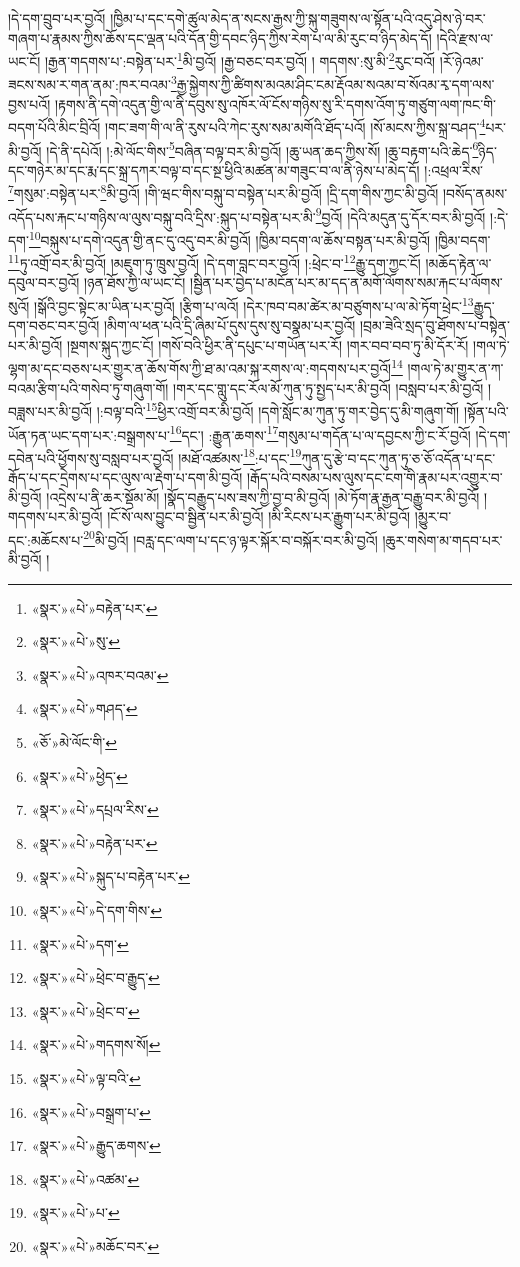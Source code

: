 །དེ་དག་བྲུབ་པར་བྱའོ། །ཁྱིམ་པ་དང་དགེ་ཚུལ་མེད་ན་སངས་རྒྱས་ཀྱི་སྐུ་གཟུགས་ལ་སྟོན་པའི་འདུ་ཤེས་ཉེ་བར་གཞག་པ་རྣམས་ཀྱིས་ཆོས་དང་ལྡན་པའི་དོན་གྱི་དབང་ཉིད་ཀྱིས་རེག་པ་ལ་མི་རུང་བ་ཉིད་མེད་དོ། །དེའི་རྫས་ལ་ཡང་ངོ། །རྒྱན་གདགས་པ་:བསྟེན་པར་\footnote{«སྣར་»«པེ་»བརྟེན་པར་}མི་བྱའོ། །རྒྱ་བཅང་བར་བྱའོ། །
གདགས་:སུ་མི་\footnote{«སྣར་»«པེ་»སུ་}རུང་བའོ། །རོ་ཉེའམ་ཟངས་སམ་ར་གན་ནམ་:ཁར་བའམ་\footnote{«སྣར་»«པེ་»འཁར་བའམ་}རྒྱ་སྐྱེགས་ཀྱི་ཚིགས་མའམ་ཤིང་ངམ་རྡོའམ་སའམ་བ་སོའམ་རྭ་དག་ལས་བྱས་པའོ། །རྟགས་ནི་དགེ་འདུན་གྱི་ལ་ནི་དབུས་སུ་འཁོར་ལོ་ངོས་གཉིས་སུ་རི་དགས་འོག་ཏུ་གཙུག་ལག་ཁང་གི་བདག་པོའི་མིང་བྲིའོ། །གང་ཟག་གི་ལ་ནི་རུས་པའི་ཀེང་རུས་སམ་མགོའི་ཐོད་པའོ། །སོ་མངས་ཀྱིས་སྐྲ་བཤད་\footnote{«སྣར་»«པེ་»གཤད་}པར་མི་བྱའོ། །དེ་ནི་དཔེའོ། །:མེ་ལོང་གིས་\footnote{«ཅོ་»མེ་ལོང་གི་}བཞིན་བལྟ་བར་མི་བྱའོ། །ཆུ་ཡན་ཆད་ཀྱིས་སོ། །ཆུ་བརྟག་པའི་ཆེད་\footnote{«སྣར་»«པེ་»ཕྱེད་}ཉིད་དང་གཉེར་མ་དང་རྨ་དང་སྐྲ་དཀར་བལྟ་བ་དང་སྔ་ཕྱིའི་མཚན་མ་གཟུང་བ་ལ་ནི་ཉེས་པ་མེད་དོ། །:འཕྲལ་རིས་\footnote{«སྣར་»«པེ་»དཔྲལ་རིས་}གསུམ་:བསྟེན་པར་\footnote{«སྣར་»«པེ་»བརྟེན་པར་}མི་བྱའོ། །གི་ཝང་གིས་བསྐུ་བ་བསྟེན་པར་མི་བྱའོ། །དྲི་དག་གིས་ཀྱང་མི་བྱའོ། །བསོད་ནམས་འདོད་པས་རྐང་པ་གཉིས་ལ་ལུས་བསྐུ་བའི་དྲིས་:སྐུད་པ་བསྟེན་པར་མི་\footnote{«སྣར་»«པེ་»སྐུད་པ་བརྟེན་པར་}བྱའོ། །དེའི་མདུན་དུ་དོར་བར་མི་བྱའོ། །:དེ་དག་\footnote{«སྣར་»«པེ་»དེ་དག་གིས་}བསྐུས་པ་དགེ་འདུན་གྱི་ནང་དུ་འདུ་བར་མི་བྱའོ། །ཁྱིམ་བདག་ལ་ཆོས་བསྟན་པར་མི་བྱའོ། །ཁྱིམ་བདག་\footnote{«སྣར་»«པེ་»དག་}ཏུ་འགྲོ་བར་མི་བྱའོ། །མཇུག་ཏུ་ཁྲུས་བྱའོ། །དེ་དག་བླང་བར་བྱའོ། །:ཕྲེང་བ་\footnote{«སྣར་»«པེ་»ཕྲེང་བ་རྒྱུད་}རྒྱུ་དག་ཀྱང་ངོ། །མཆོད་རྟེན་ལ་དབུལ་བར་བྱའོ། །ཉན་ཐོས་ཀྱི་ལ་ཡང་ངོ། །སྦྱིན་པར་བྱེད་པ་མངོན་པར་མ་དད་ན་མགོ་ལོགས་སམ་རྐང་པ་ལོགས་སུའོ། །སྒོའི་བྱང་སྟེང་མ་ཡིན་པར་བྱའོ། །རྩིག་པ་ལའོ། །དེར་ཁབ་བམ་ཚེར་མ་བཙུགས་པ་ལ་མེ་ཏོག་ཕྲེང་\footnote{«སྣར་»«པེ་»ཕྲེང་བ་}རྒྱུད་དག་བཅང་བར་བྱའོ། །མིག་ལ་ཕན་པའི་དྲི་ཞིམ་པོ་དུས་དུས་སུ་བསྣམ་པར་བྱའོ། །བྲམ་ཟེའི་སྲད་བུ་ཐོགས་པ་བསྟེན་པར་མི་བྱའོ། །སྔགས་སྐུད་ཀྱང་ངོ། །གསོ་བའི་ཕྱིར་ནི་དཔུང་པ་གཡོན་པར་རོ། །གར་བབ་བབ་ཏུ་མི་དོར་རོ། །གལ་ཏེ་ལྷག་མ་དང་བཅས་པར་གྱུར་ན་ཆོས་གོས་ཀྱི་ཐ་མ་འམ་སྐ་རགས་ལ་:གདགས་པར་བྱའོ།\footnote{«སྣར་»«པེ་»གདགས་སོ།} །གལ་ཏེ་མ་གྱུར་ན་ཀ་བའམ་རྩིག་པའི་གསེབ་ཏུ་གཞུག་གོ། །གར་དང་གླུ་དང་རོལ་མོ་ཀུན་ཏུ་སྤྱད་པར་མི་བྱའོ། །བསླབ་པར་མི་བྱའོ། །བཟླས་པར་མི་བྱའོ། །:བལྟ་བའི་\footnote{«སྣར་»«པེ་»ལྟ་བའི་}ཕྱིར་འགྲོ་བར་མི་བྱའོ། །དགེ་སློང་མ་ཀུན་ཏུ་གར་བྱེད་དུ་མི་གཞུག་གོ། །སྟོན་པའི་ཡོན་ཏན་ཡང་དག་པར་:བསྒྲགས་པ་\footnote{«སྣར་»«པེ་»བསྒྲག་པ་}དང་། :རྒྱུན་ཆགས་\footnote{«སྣར་»«པེ་»རྒྱུད་ཆགས་}གསུམ་པ་གདོན་པ་ལ་དབྱངས་ཀྱི་ང་རོ་བྱའོ། །དེ་དག་དབེན་པའི་ཕྱོགས་སུ་བསླབ་པར་བྱའོ། །མཐོ་འཚམས་\footnote{«སྣར་»«པེ་»འཚམ་}:པ་དང་\footnote{«སྣར་»«པེ་»པ་}ཀུན་དུ་རྩེ་བ་དང་ཀུན་ཏུ་ཅ་ཅོ་འདོན་པ་དང་རྒོད་པ་དང་དྲེགས་པ་དང་ལུས་ལ་རྡེག་པ་དག་མི་བྱའོ། །རྒོད་པའི་བསམ་པས་ལུས་དང་ངག་གི་རྣམ་པར་འགྱུར་བ་མི་བྱའོ། །འདྲེས་པ་ནི་ཆར་སྡོམ་མོ། །སྣོད་བརྒྱུད་པས་ཟས་ཀྱི་བྱ་བ་མི་བྱའོ། །མེ་ཏོག་རྣ་རྒྱན་བརྒྱུ་བར་མི་བྱའོ། །གདགས་པར་མི་བྱའོ། །ངོ་སོ་ལས་བྱུང་བ་སྦྱིན་པར་མི་བྱའོ། །མི་རིངས་པར་རྒྱུག་པར་མི་བྱའོ། །མྱུར་བ་དང་:མཆོངས་པ་\footnote{«སྣར་»«པེ་»མཆོང་བར་}མི་བྱའོ། །བརླ་དང་ལག་པ་དང་ཉ་ལྟར་སྐོར་བ་བསྐོར་བར་མི་བྱའོ། །ཆུར་གསེག་མ་གདབ་པར་མི་བྱའོ། །
